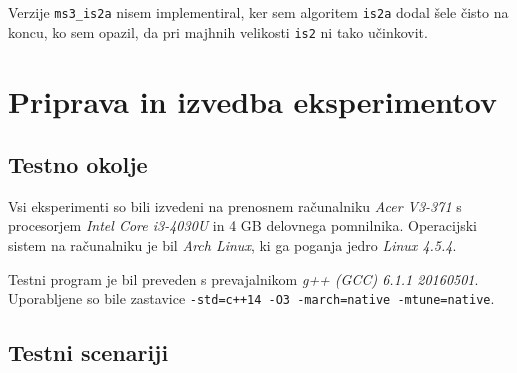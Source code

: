 \documentclass[11pt,a4paper]{article}
\theoremstyle{plain}
\theoremstyle{definition}
\begin{document}
Verzije \lstinline!ms3_is2a! nisem implementiral, ker sem algoritem \lstinline!is2a! dodal šele čisto na koncu, ko sem opazil, da pri majhnih velikosti \lstinline!is2! ni tako učinkovit.

\section{Priprava in izvedba eksperimentov}

\subsection{Testno okolje}

Vsi eksperimenti so bili izvedeni na prenosnem računalniku \emph{Acer V3-371} s procesorjem \emph{Intel Core i3-4030U} in 4 GB delovnega pomnilnika. Operacijski sistem na računalniku je bil \emph{Arch Linux}, ki ga poganja jedro \emph{Linux 4.5.4}.

Testni program je bil preveden s prevajalnikom \emph{g++ (GCC) 6.1.1 20160501}. Uporabljene so bile zastavice \lstinline!-std=c++14 -O3 -march=native -mtune=native!.

\subsection{Testni scenariji}
\end{document}
